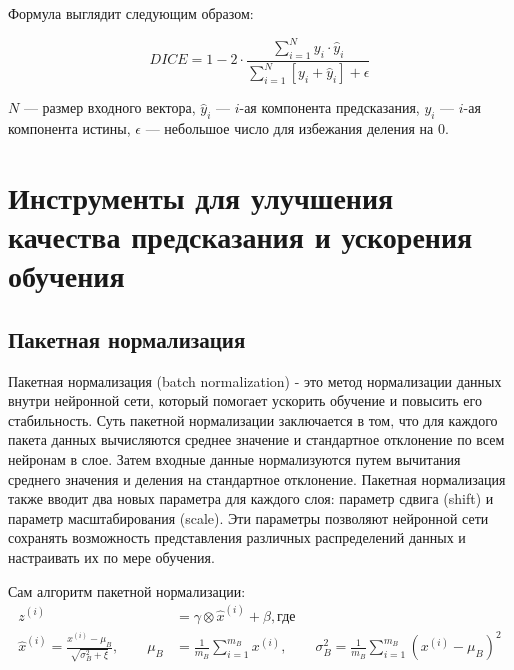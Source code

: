 Формула выглядит следующим образом:

\begin{equation}
	DICE = 1 - 2 \cdot \frac{\sum_{i=1}^{N} y_i \cdot \hat{y}_i}{\sum_{i=1}^{N} \left[y_i + \hat{y}_i \right] + \epsilon}
\end{equation}


\noindent $N$ --- размер входного вектора, $\hat{y}_i$ --- $i$-ая компонента
предсказания, $y_i$ --- $i$-ая компонента истины, $\epsilon$ --- небольшое
число для избежания деления на 0.

\section{Инструменты для улучшения качества предсказания и ускорения обучения}

\subsection{Пакетная нормализация}

Пакетная нормализация (batch normalization) - это метод нормализации данных
внутри нейронной сети, который помогает ускорить обучение и повысить его
стабильность. Суть пакетной нормализации заключается в том, что для каждого
пакета данных вычисляются среднее значение и стандартное отклонение по всем
нейронам в слое. Затем входные данные нормализуются путем вычитания среднего
значения и деления на стандартное отклонение. Пакетная нормализация также
вводит два новых параметра для каждого слоя: параметр сдвига (shift) и параметр
масштабирования (scale). Эти параметры позволяют нейронной сети сохранять
возможность представления различных распределений данных и настраивать их по
мере обучения.

Сам алгоритм пакетной нормализации:
\begin{align*}
	z^{(i)} & = \gamma \otimes \hat x^{(i)} + \beta, \text{где}        \\
	\hat x^{(i)} = \frac{x^{(i)} - \mu_B}{\sqrt{\sigma^2_B + \xi}}, \qquad
	\mu_B   & = \frac{1}{m_B} \sum\limits_{i = 1}^{m_B}x^{(i)}, \qquad
	\sigma_B^2 = \frac{1}{m_B} \sum\limits_{i = 1}^{m_B}(x^{(i)} - \mu_B)^2
\end{align*}

